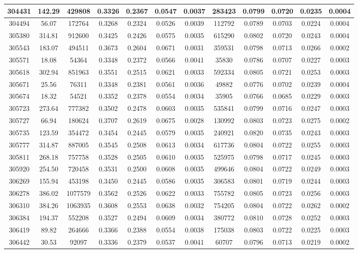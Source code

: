 \documentclass[10pt]{extarticle}
\begin{document}
\begin{longtable}{|c|c|c|c|c|c|c|c|c|c|c|c|}
304431&142.29&429808&0.3326&0.2367&0.0547&0.0037&283423&0.0799&0.0720&0.0235&0.0004 \\ 
\hline 
304494&56.07&172764&0.3268&0.2324&0.0526&0.0039&112792&0.0789&0.0703&0.0224&0.0004 \\ 
\hline 
305380&314.81&912600&0.3425&0.2426&0.0575&0.0035&615290&0.0802&0.0720&0.0243&0.0004 \\ 
\hline 
305543&183.07&494511&0.3673&0.2604&0.0671&0.0031&359531&0.0798&0.0713&0.0266&0.0002 \\ 
\hline 
305571&18.08&54364&0.3348&0.2372&0.0566&0.0041&35830&0.0786&0.0707&0.0227&0.0003 \\ 
\hline 
305618&302.94&851963&0.3551&0.2515&0.0621&0.0033&592334&0.0805&0.0721&0.0253&0.0003 \\ 
\hline 
305671&25.56&76311&0.3348&0.2381&0.0561&0.0036&49882&0.0776&0.0702&0.0239&0.0004 \\ 
\hline 
305674&18.32&54521&0.3352&0.2378&0.0554&0.0034&35905&0.0766&0.0685&0.0229&0.0003 \\ 
\hline 
305723&273.64&777382&0.3502&0.2478&0.0603&0.0035&535841&0.0799&0.0716&0.0247&0.0003 \\ 
\hline 
305727&66.94&180624&0.3707&0.2619&0.0675&0.0028&130992&0.0803&0.0723&0.0275&0.0002 \\ 
\hline 
305735&123.59&354472&0.3454&0.2445&0.0579&0.0035&240921&0.0820&0.0735&0.0243&0.0003 \\ 
\hline 
305777&314.87&887005&0.3545&0.2508&0.0613&0.0034&617736&0.0804&0.0722&0.0255&0.0003 \\ 
\hline 
305811&268.18&757758&0.3528&0.2505&0.0610&0.0035&525975&0.0798&0.0717&0.0245&0.0003 \\ 
\hline 
305920&254.50&720458&0.3531&0.2500&0.0608&0.0035&499646&0.0804&0.0722&0.0249&0.0003 \\ 
\hline 
306269&155.94&453198&0.3450&0.2445&0.0586&0.0035&306583&0.0801&0.0719&0.0244&0.0003 \\ 
\hline 
306278&386.02&1077579&0.3562&0.2526&0.0622&0.0033&755782&0.0805&0.0723&0.0256&0.0003 \\ 
\hline 
306310&384.26&1063935&0.3608&0.2553&0.0638&0.0032&754205&0.0804&0.0722&0.0262&0.0002 \\ 
\hline 
306384&194.37&552208&0.3527&0.2494&0.0609&0.0034&380772&0.0810&0.0728&0.0252&0.0003 \\ 
\hline 
306419&89.82&264666&0.3366&0.2388&0.0554&0.0038&175038&0.0803&0.0722&0.0225&0.0003 \\ 
\hline 
306442&30.53&92097&0.3336&0.2379&0.0537&0.0041&60707&0.0796&0.0713&0.0219&0.0002 \\ 

\end{longtable}
\end{document}
